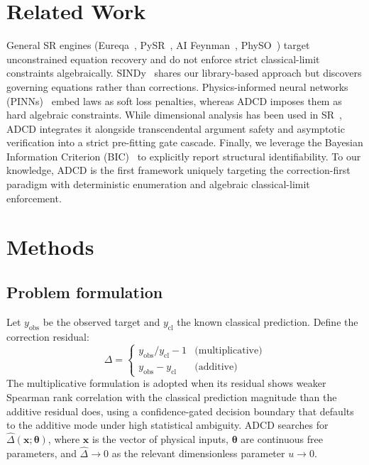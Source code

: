 ﻿\documentclass{article}
\begin{document}
\section{Related Work}

General SR engines (Eureqa~\cite{schmidt2009}, PySR~\cite{cranmer2023}, AI Feynman~\cite{udrescu2020}, PhySO~\cite{tenachi2023}) target unconstrained equation recovery and do not enforce strict classical-limit constraints algebraically. SINDy~\cite{brunton2016} shares our library-based approach but discovers governing equations rather than corrections. Physics-informed neural networks (PINNs)~\cite{raissi2019,karniadakis2021} embed laws as soft loss penalties, whereas ADCD imposes them as hard algebraic constraints. While dimensional analysis has been used in SR~\cite{tenachi2023,petersen2021}, ADCD integrates it alongside transcendental argument safety and asymptotic verification into a strict pre-fitting gate cascade. Finally, we leverage the Bayesian Information Criterion (BIC)~\cite{schwarz1978,kass1995} to explicitly report structural identifiability. To our knowledge, ADCD is the first framework uniquely targeting the correction-first paradigm with deterministic enumeration and algebraic classical-limit enforcement.

\section{Methods}

\subsection{Problem formulation}

Let $y_\mathrm{obs}$ be the observed target and $y_\mathrm{cl}$ the known
classical prediction.
Define the correction residual:
\begin{equation}
  \Delta =
  \begin{cases}
    y_\mathrm{obs}/y_\mathrm{cl} - 1 & \text{(multiplicative)} \\
    y_\mathrm{obs} - y_\mathrm{cl}   & \text{(additive)}
  \end{cases}
\end{equation}
The multiplicative formulation is adopted when its residual shows weaker Spearman
rank correlation with the classical prediction magnitude than the
additive residual does, using a confidence-gated decision boundary that defaults
to the additive mode under high statistical ambiguity.
ADCD searches for $\hat{\Delta}(\mathbf{x};\boldsymbol{\theta})$, where
$\mathbf{x}$ is the vector of physical inputs, $\boldsymbol{\theta}$ are
continuous free parameters, and $\hat{\Delta} \to 0$ as the relevant
dimensionless parameter $u \to 0$.
\end{document}
